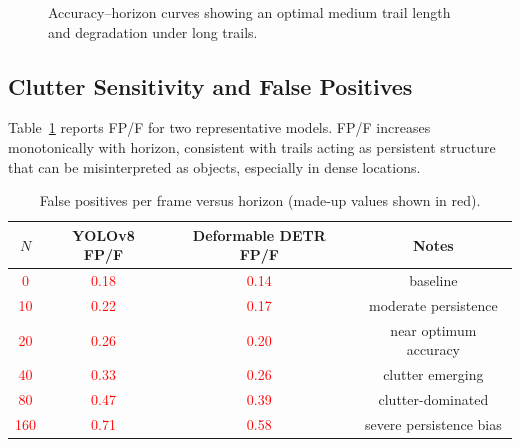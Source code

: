 \documentclass[twocolumn, 10pt]{article}
\newcommand{\ph}[1]{\textcolor{red}{#1}}
\begin{document}
\begin{figure}[t]
\centering
{}
\caption{Accuracy--horizon curves showing an optimal medium trail length and degradation under long trails.}
\label{fig:map_plot}
\end{figure}

\subsection{Clutter Sensitivity and False Positives}
Table~\ref{tab:fp_curve} reports FP/F for two representative models. FP/F increases monotonically with horizon, consistent with trails acting as persistent structure that can be misinterpreted as objects, especially in dense locations.

\begin{table}[t]
\centering
\caption{False positives per frame versus horizon (made-up values shown in red).}
\label{tab:fp_curve}
\begin{tabular}{@{}cccc@{}}
\toprule
$N$ & YOLOv8 FP/F & Deformable DETR FP/F & Notes \\
\midrule
\ph{0}   & \ph{0.18} & \ph{0.14} & baseline \\
\ph{10}  & \ph{0.22} & \ph{0.17} & moderate persistence \\
\ph{20}  & \ph{0.26} & \ph{0.20} & near optimum accuracy \\
\ph{40}  & \ph{0.33} & \ph{0.26} & clutter emerging \\
\ph{80}  & \ph{0.47} & \ph{0.39} & clutter-dominated \\
\ph{160} & \ph{0.71} & \ph{0.58} & severe persistence bias \\
\bottomrule
\end{tabular}
\end{table}
\end{document}
